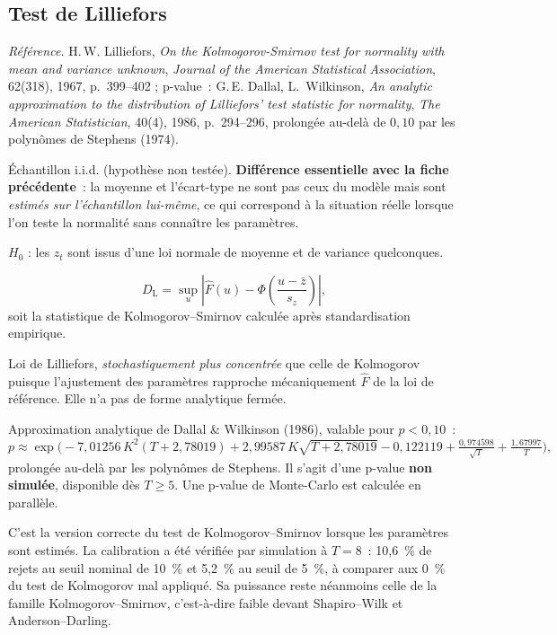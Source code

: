 \documentclass[a4paper,11pt]{article}
\newcommand{\refl}[1]{{\small\textcolor{maincolor!70!black}{\textit{Référence.} #1}}\par\smallskip}
\newcounter{ficheid}
\newenvironment{fiche}[1]{%
  \stepcounter{ficheid}%
  \phantomsection
  \subsection{#1}%
  \label{fiche:\theficheid}%
}{%
  \end{description}\vspace{0.5em}%
}
\newcommand{\Cadre}{%
  \begin{description}[leftmargin=0pt, style=unboxed, itemsep=3pt, topsep=3pt, parsep=2pt]%
  \item[\textcolor{financeblue}{\textbf{1. Cadre, notations et hypothèses de validité (non testées).}}]}
\newcommand{\Hzero}{\item[\textcolor{financeblue}{\textbf{2. Hypothèse nulle.}}]}
\newcommand{\Stat}{\item[\textcolor{financeblue}{\textbf{3. Statistique de test.}}]}
\newcommand{\Loi}{\item[\textcolor{financeblue}{\textbf{4. Loi sous $H_0$.}}]}
\newcommand{\Pval}{\item[\textcolor{financeblue}{\textbf{5. p-value.}}]}
\newcommand{\Usage}{\item[\textcolor{financeblue}{\textbf{6. Usage et limites.}}]}
\begin{document}
\begin{fiche}{Test de Lilliefors}
\refl{H.\,W. Lilliefors, \emph{On the Kolmogorov-Smirnov test for normality with mean and variance
unknown}, \emph{Journal of the American Statistical Association}, 62(318), 1967, p.~399--402 ;
p-value~: G.\,E. Dallal, L.~Wilkinson, \emph{An analytic approximation to the distribution of
Lilliefors' test statistic for normality}, \emph{The American Statistician}, 40(4), 1986,
p.~294--296, prolongée au-delà de $0{,}10$ par les polynômes de Stephens (1974).}
\Cadre
Échantillon i.i.d. (hypothèse non testée). \textbf{Différence essentielle avec la fiche
précédente}~: la moyenne et l'écart-type ne sont pas ceux du modèle mais sont \emph{estimés sur
l'échantillon lui-même}, ce qui correspond à la situation réelle lorsque l'on teste la normalité
sans connaître les paramètres.
\Hzero
$H_0$ : les $z_t$ sont issus d'une loi normale de moyenne et de variance quelconques.
\Stat
\[
  D_{\mathrm{L}} = \sup_u \left| \hat F(u) - \Phi\!\left(\frac{u - \bar z}{s_z}\right) \right|,
\]
soit la statistique de Kolmogorov--Smirnov calculée après standardisation empirique.
\Loi
Loi de Lilliefors, \emph{stochastiquement plus concentrée} que celle de Kolmogorov puisque
l'ajustement des paramètres rapproche mécaniquement $\hat F$ de la loi de référence. Elle n'a pas
de forme analytique fermée.
\Pval
Approximation analytique de Dallal \& Wilkinson (1986), valable pour $p < 0{,}10$~:
\[
  p \approx \exp\!\Big(-7{,}01256\,K^2(T + 2{,}78019) + 2{,}99587\,K\sqrt{T + 2{,}78019}
  - 0{,}122119 + \tfrac{0{,}974598}{\sqrt{T}} + \tfrac{1{,}67997}{T}\Big),
\]
prolongée au-delà par les polynômes de Stephens. Il s'agit d'une p-value \textbf{non simulée},
disponible dès $T \ge 5$. Une p-value de Monte-Carlo est calculée en parallèle.
\Usage
C'est la version correcte du test de Kolmogorov--Smirnov lorsque les paramètres sont estimés.
La calibration a été vérifiée par simulation à
$T = 8$~: 10,6~\% de rejets au seuil nominal de 10~\% et 5,2~\% au seuil de 5~\%, à comparer aux
0~\% du test de Kolmogorov mal appliqué. Sa puissance reste néanmoins celle de la famille
Kolmogorov--Smirnov, c'est-à-dire faible devant Shapiro--Wilk et Anderson--Darling.
\end{fiche}
\end{document}
